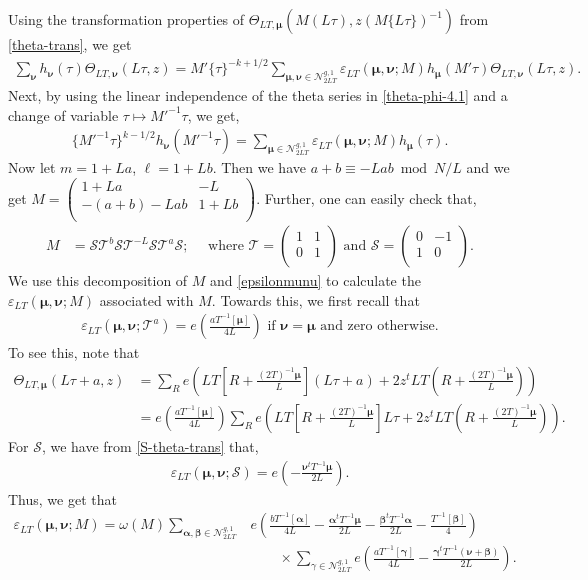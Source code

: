 \documentclass[11pt]{amsart}
\numberwithin{equation}{section}
\newcommand{\mc}{\mathcal}
\newcommand{\smat}[4]{\left( \begin{smallmatrix} #1 & #2 \\ #3 & #4 \\ \end{smallmatrix} \right)}
\newcommand{\q}{\quad}
\newcommand{\sumn}{\sum \nolimits}
\begin{document}
Using the transformation properties of $\Theta_{LT, \bm\mu}\left(M(L\tau), z(M\{L\tau\})^{-1}\right)$ from \eqref{theta-trans}, we get
\begin{align} \label{theta-phi-4.1}
\sum_{\bm\nu}h_{\bm\nu}(\tau) \Theta_{LT,\bm\nu}(L\tau, z)=M'\{\tau\}^{-k+1/2}\sum_{\bm\mu, \bm\nu\in \mc N_{2LT}^{g,1}}\varepsilon_{LT}(\bm\mu, \bm\nu; M) h_{\bm\mu}(M'\tau)   \Theta_{LT, \bm\nu}(L\tau,z) .
\end{align}
Next, by using the linear independence of the theta series in \eqref{theta-phi-4.1} and a change of variable $\tau\mapsto M'^{-1}\tau$, we get,
\begin{align}\label{hmutrans-sec5}
  \{M'^{-1} \tau\}^{k-1/2}  h_{\bm\nu}(M'^{-1}\tau)=\sumn_{\bm\mu\in\mc N_{2LT}^{g,1} }\varepsilon_{LT}(\bm\mu, \bm\nu;M) h_{\bm\mu}(\tau).  
\end{align}
Now let $m= 1+La$, $\ell =1+Lb$. Then we have $a+b\equiv -Lab \bmod N/L$ and we get $M=\smat{1+L a}{-L}{-( a+ b)-L a b}{1+L b}$. Further, one can easily check that,
\begin{align}
   M&= \mc S\mc T^{ b}\mc S\mc T^{-L}\mc S\mc T^{ a}\mc S; \q\text{ where } \mc T=\smat{1}{1}{0}{1} \text{ and } \mc S=\smat{0}{-1}{1}{0}.
\end{align}
We use this decomposition of $M$ and \eqref{epsilonmunu} to calculate the $\varepsilon_{LT}(\bm\mu, \bm\nu; M)$ associated with $M$. Towards this, we first recall that 
\begin{align}
\varepsilon_{LT}(\bm\mu, \bm\nu; \mc T^a)=e\left(\frac{aT^{-1}[\bm\mu]}{4L}\right)   \text{ if } \bm\nu=\bm\mu \text{ and zero otherwise.} 
\end{align}
 To see this, note that
\begin{align}
 \Theta_{LT,\bm\mu}(L\tau+ a, z)&=\sumn_{R}e\left(LT[R+\frac{(2T)^{-1}\bm\mu}{L}](L\tau+a)+2z^tLT(R+\frac{(2T)^{-1}\bm\mu}{L})\right) \\
 &= e\left(\frac{aT^{-1}[\bm\mu]}{4L}\right)  \sumn_{R}e\left(LT[R+\frac{(2T)^{-1}\bm\mu}{L}]L\tau+2z^tLT(R+\frac{(2T)^{-1}\bm\mu}{L})\right).
\end{align}
For $\mc S$, we have from \eqref{S-theta-trans} that,
\begin{align}
\varepsilon_{LT}(\bm\mu, \bm\nu; \mc S)=   e\left(-\frac{\bm\nu^tT^{-1}\bm\mu}{2L}\right).
\end{align}
Thus, we get that
\begin{align}
\varepsilon_{LT}(\bm\mu, \bm\nu;M)= \omega(M) \sumn_{\bm{\alpha}, \bm{\beta}\in \mc N_{2LT}^{g,1}} &e\left(\frac{b T^{-1}[\bm{\alpha}]}{4L}-\frac{\bm{\alpha}^tT^{-1}\bm\mu}{2L}-\frac{\bm{\beta}^tT^{-1}\bm{\alpha}}{2L}-\frac{T^{-1}[\bm{\beta}]}{4}\right)\\
&\q\q\times\sumn_{\gamma\in \mc N_{2LT}^{g,1}}e\left(\frac{aT^{-1}[\bm\gamma]}{4L}-\frac{\bm\gamma^tT^{-1}(\bm\nu+\bm{\beta})}{2L}\right).   
\end{align}
\end{document}
